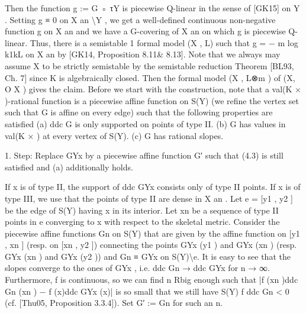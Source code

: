 \documentclass[
  10pt,
]{article}
\newenvironment{Shaded}{}{}
\newcommand{\NormalTok}[1]{#1}
\begin{document}
\begin{Shaded}
\begin{Highlighting}[]
\NormalTok{Then the function g := G ◦ τY is piecewise Q{-}linear in the sense of [GK15] on Y . Setting}
\NormalTok{g ≡ 0 on X an \textbackslash{}Y , we get a well{-}defined continuous non{-}negative function g on X an and}
\NormalTok{we have a G{-}covering of X an on which g is piecewise Q{-}linear. Thus, there is a semistable}
\NormalTok{                                         1}
\NormalTok{formal model (X , L) such that g = − m     log k1kL on X an by [GK14, Proposition 8.11\&}
\NormalTok{8.13]. Note that we always may assume X to be strictly semistable by the semistable}
\NormalTok{reduction Theorem [BL93, Ch. 7] since K is algebraically closed. Then the formal model}
\NormalTok{(X , L⊗m ) of (X, O X ) gives the claim.}
\NormalTok{   Before we start with the construction, note that a val(K × ){-}rational function is a}
\NormalTok{piecewise affine function on S(Y) (we refine the vertex set such that G is affine on every}
\NormalTok{edge) such that the following properties are satisfied}
\NormalTok{   (a) ddc G is only supported on points of type II.}
\NormalTok{   (b) G has values in val(K × ) at every vertex of S(Y).}
\NormalTok{   (c) G has rational slopes.}


\NormalTok{    1. Step: Replace GYx by a piecewise affine function G′ such that (4.3) is still}
\NormalTok{             satisfied and (a) additionally holds.}

\NormalTok{   If x is of type II, the support of ddc GYx consists only of type II points. If x is of type III,}
\NormalTok{we use that the points of type II are dense in X an . Let e = [y1 , y2 ] be the edge of S(Y)}
\NormalTok{having x in its interior. Let xn be a sequence of type II points in e converging to x with}
\NormalTok{respect to the skeletal metric. Consider the piecewise affine functions Gn on S(Y) that}
\NormalTok{are given by the affine function on [y1 , xn ] (resp. on [xn , y2 ]) connecting the points GYx (y1 )}
\NormalTok{and GYx (xn ) (resp. GYx (xn ) and GYx (y2 )) and Gn ≡ GYx on S(Y)\textbackslash{}e. It is easy to see that}
\NormalTok{the slopes converge to the ones of GYx , i.e. ddc Gn → ddc GYx for n → ∞. Furthermore, f}
\NormalTok{is continuous, so we can find n Rbig enough such that |f (xn )ddc Gn (xn ) − f (x)ddc GYx (x)|}
\NormalTok{is so small that we still have S(Y) f ddc Gn \textless{} 0 (cf. [Thu05, Proposition 3.3.4]). Set}
\NormalTok{G′ := Gn for such an n.}


\end{Highlighting}
\end{Shaded}
\end{document}
